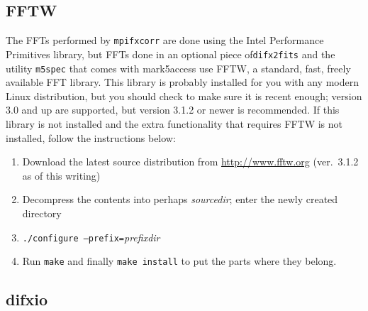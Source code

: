 
\subsection{FFTW} \label{sec:fftw}

The FFTs performed by {\tt mpifxcorr} are done using the Intel Performance Primitives library, but FFTs done in an optional piece of{\tt difx2fits} and the utility {\tt m5spec} that comes with mark5access use FFTW, a standard, fast, freely available FFT library.
This library is probably installed for you with any modern Linux distribution, but you should check to make sure it is recent enough; version 3.0 and up are supported, but version 3.1.2 or newer is recommended.
If this library is not installed and the extra functionality that requires FFTW is not installed, follow the instructions below:
\begin{enumerate}
\item Download the latest source distribution from \url{http://www.fftw.org} (ver.\ 3.1.2 as of this writing)
\item Decompress the contents into perhaps {\em sourcedir}; enter the newly created directory
\item {\tt ./configure --prefix=}{\em prefixdir}
\item Run {\tt make} and finally {\tt make install} to put the parts where they belong.
\end{enumerate}


















\subsection{difxio} \label{sec:difxio}

